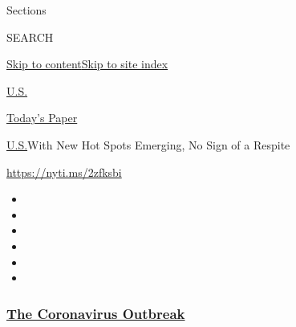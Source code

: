 Sections

SEARCH

\protect\hyperlink{site-content}{Skip to
content}\protect\hyperlink{site-index}{Skip to site index}

\href{https://www.nytimes3xbfgragh.onion/section/us}{U.S.}

\href{https://myaccount.nytimes3xbfgragh.onion/auth/login?response_type=cookie\&client_id=vi}{}

\href{https://www.nytimes3xbfgragh.onion/section/todayspaper}{Today's
Paper}

\href{/section/us}{U.S.}\textbar{}With New Hot Spots Emerging, No Sign
of a Respite

\url{https://nyti.ms/2zfksbi}

\begin{itemize}
\item
\item
\item
\item
\item
\item
\end{itemize}

\hypertarget{the-coronavirus-outbreak}{%
\subsubsection{\texorpdfstring{\href{https://www.nytimes3xbfgragh.onion/news-event/coronavirus?name=styln-coronavirus-national\&region=TOP_BANNER\&block=storyline_menu_recirc\&action=click\&pgtype=Article\&impression_id=0ddc8940-f4bb-11ea-bb8e-792101acfed7\&variant=undefined}{The
Coronavirus
Outbreak}}{The Coronavirus Outbreak}}\label{the-coronavirus-outbreak}}

